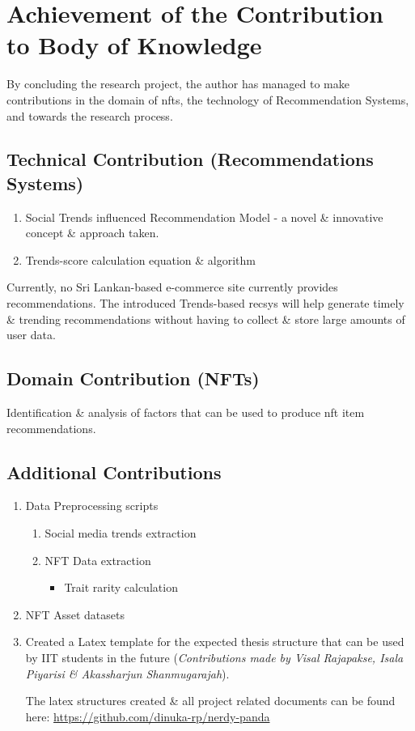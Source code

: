 \section{Achievement of the Contribution to Body of Knowledge}

By concluding the research project, the author has managed to make contributions in the domain of \gls{nft}s, the technology of Recommendation Systems, and towards the research process.

\subsection{Technical Contribution (Recommendations Systems)}

\begin{enumerate}
\item Social Trends influenced Recommendation Model - a novel \& innovative concept \& approach taken.
\item Trends-score calculation equation \& algorithm
\end{enumerate}

\noindent Currently, no Sri Lankan-based e-commerce site currently provides recommendations. The introduced Trends-based \gls{recsys} will help generate timely \& trending recommendations without having to collect \& store large amounts of user data.

\subsection{Domain Contribution (NFTs)}
Identification \& analysis of factors that can be used to produce \gls{nft} item recommendations.

\subsection{Additional Contributions}
\begin{enumerate}
\item Data Preprocessing scripts
    \begin{enumerate}
        \item Social media trends extraction
        \item NFT Data extraction
        \begin{itemize}
            \item Trait rarity calculation
        \end{itemize}
     \end{enumerate}
     
\item NFT Asset datasets
\item Created a Latex template for the expected thesis structure that can be used by IIT students in the future (\textit{Contributions made by Visal Rajapakse, Isala Piyarisi \& Akassharjun Shanmugarajah}).

The latex structures created \& all project related documents can be found here: \url{https://github.com/dinuka-rp/nerdy-panda}
\end{enumerate}


